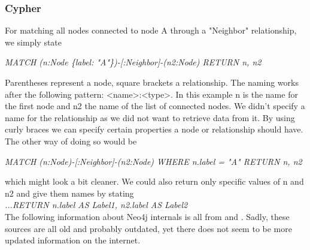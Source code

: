 \subsubsection{Cypher}
For matching all nodes connected to node A through a "Neighbor" relationship, we simply state
\begin{exmp}
\label{ex231}
\emph{MATCH (n:Node \{label: "A"\})-[:Neighbor]-(n2:Node) RETURN n, n2 }
\end{exmp}
Parentheses represent a node, square brackets a relationship. The naming works after the following pattern: <name>:<type>. In this example n is the name for the first node and n2 the name of the list of connected nodes. We didn't specify a name for the relationship as we did not want to retrieve data from it. By using curly braces we can specify certain properties a node or relationship should have. The other way of doing so would be 
\begin{exmp}
\label{ex232}
\emph{MATCH (n:Node)-[:Neighbor]-(n2:Node) WHERE n.label = "A" RETURN n, n2 }
\end{exmp}
which might look a bit cleaner. We could also return only specific values of n and n2 and give them names by stating \\
\emph{ ...RETURN n.label AS Label1, n2.label AS Label2 }\\
The following information about Neo4j internals is all from \cite{NeoInternals} and \cite{Neo4jInternalsPP}. Sadly, these sources are all old and probably outdated, yet there does not seem to be more updated information on the internet.
